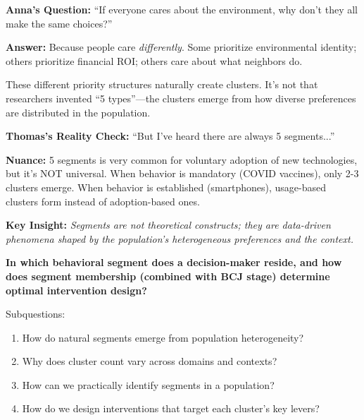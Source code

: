 \begin{tcolorbox}[colback=yellow!5!white, colframe=orange!75!black,
    title=Intuition: Why Do Natural Segments Exist?]

\textbf{Anna's Question:} ``If everyone cares about the environment, why don't
they all make the same choices?''

\textbf{Answer:} Because people care \emph{differently}. Some prioritize environmental
identity; others prioritize financial ROI; others care about what neighbors do.

These different priority structures naturally create clusters. It's not that researchers
invented ``5 types''---the clusters emerge from how diverse preferences are distributed
in the population.

\textbf{Thomas's Reality Check:} ``But I've heard there are always 5 segments...''

\textbf{Nuance:} 5 segments is very common for voluntary adoption of new technologies,
but it's NOT universal. When behavior is mandatory (COVID vaccines), only 2-3 clusters
emerge. When behavior is established (smartphones), usage-based clusters form instead
of adoption-based ones.

\textbf{Key Insight:} \emph{Segments are not theoretical constructs; they are data-driven
phenomena shaped by the population's heterogeneous preferences and the context.}

\end{tcolorbox}


\begin{tcolorbox}[colback=red!5!white, colframe=red!75!black,
    title=Central Question of Chapter 14]

\textbf{In which behavioral segment does a decision-maker reside, and how does
segment membership (combined with BCJ stage) determine optimal intervention design?}

\noindent Subquestions:
\begin{enumerate}[nosep]
    \item How do natural segments emerge from population heterogeneity?
    \item Why does cluster count vary across domains and contexts?
    \item How can we practically identify segments in a population?
    \item How do we design interventions that target each cluster's key levers?
\end{enumerate}

\end{tcolorbox}

